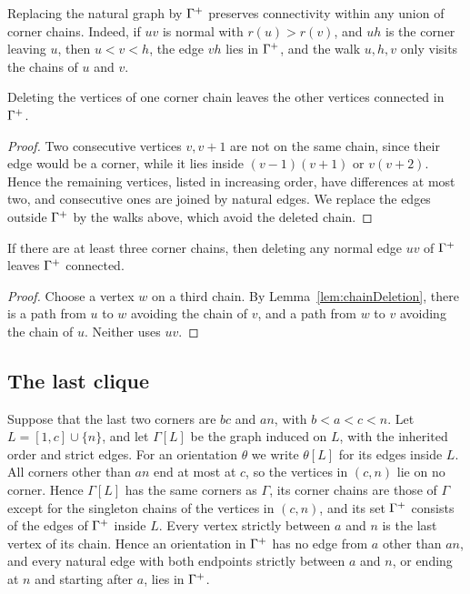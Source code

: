 Replacing the natural graph by $\Gamma^{+}$ preserves connectivity within any union
of corner chains.
Indeed, if $uv$ is normal with $r(u)>r(v)$, and $uh$ is the corner leaving $u$,
then $u<v<h$, the edge $vh$ lies in $\Gamma^{+}$, and the walk $u,h,v$ only visits
the chains of $u$ and $v$.

\begin{lemma}\label{lem:chainDeletion}
Deleting the vertices of one corner chain leaves the other vertices connected
in $\Gamma^{+}$.
\end{lemma}

\begin{proof}
Two consecutive vertices $v,v+1$ are not on the same chain, since their edge
would be a corner, while it lies inside $(v-1)(v+1)$ or $v(v+2)$.
Hence the remaining vertices, listed in increasing order, have differences at
most two, and consecutive ones are joined by natural edges.
We replace the edges outside $\Gamma^{+}$ by the walks above, which avoid the deleted
chain.
\end{proof}

\begin{lemma}\label{lem:removableEdge}
If there are at least three corner chains, then deleting any normal edge $uv$ of
$\Gamma^{+}$ leaves $\Gamma^{+}$ connected.
\end{lemma}

\begin{proof}
Choose a vertex $w$ on a third chain.
By Lemma~\ref{lem:chainDeletion}, there is a path from $u$ to $w$ avoiding the
chain of $v$, and a path from $w$ to $v$ avoiding the chain of $u$.
Neither uses $uv$.
\end{proof}

\subsection{The last clique}

Suppose that the last two corners are $bc$ and $an$, with $b<a<c<n$.
Let $L=[1,c]\cup\{n\}$, and let $\Gamma[L]$ be the graph induced on $L$, with the
inherited order and strict edges.
For an orientation $\theta$ we write $\theta[L]$ for its edges inside $L$.
All corners other than $an$ end at most at $c$, so the vertices in $(c,n)$ lie
on no corner.
Hence $\Gamma[L]$ has the same corners as $\Gamma$, its corner chains are those of
$\Gamma$ except for the singleton chains of the vertices in $(c,n)$, and its
set $\Gamma^{+}$ consists of the edges of $\Gamma^{+}$ inside $L$.
Every vertex strictly between $a$ and $n$ is the last vertex of its chain.
Hence an orientation in $\Gamma^{+}$ has no edge from $a$ other than $an$, and
every natural edge with both endpoints strictly between $a$ and $n$, or ending
at $n$ and starting after $a$, lies in $\Gamma^{+}$.

